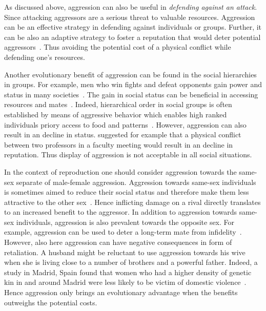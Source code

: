 As discussed above, aggression can also be useful in \textit{defending against an attack}.
Since attacking aggressors are a serious threat to valuable resources.
Aggression can be an effective strategy in defending against individuals or groups.
Further, it can be also an adaptive strategy to foster a reputation that would deter potential aggressors~\cite{Buss1997}.
Thus avoiding the potential cost of a physical conflict while defending one's resources.

Another evolutionary benefit of aggression can be found in the social hierarchies in groups.
For example, men who win fights and defeat opponents gain power and status in many societies~\cite{Hill1996}.
The gain in social status can be beneficial in accessing resources and mates~\cite{Archer2009}.
Indeed, hierarchical order in social groups is often established by means of aggressive behavior which enables high ranked individuals priory access to food and patterns~\cite{Lindenfors2011}. 
However, aggression can also result in an decline in status.
\citet{Buss1997} suggested for example that a physical conflict between two professors in a faculty meeting would result in an decline in reputation.
Thus display of aggression is not acceptable in all social situations.

In the context of reproduction one should consider aggression towards the same-sex separate of male-female aggression.
Aggression towards same-sex individuals is sometimes aimed to reduce their social status and therefore make them less attractive to the other sex~\cite{Buss1990}.
Hence inflicting damage on a rival directly translates to an increased benefit to the aggressor.
In addition to aggression towards same-sex individuals, aggression is also prevalent towards the opposite sex.
For example, aggression can be used to deter a long-term mate from infidelity~\cite{Daly1982}.
However, also here aggression can have negative consequences in form of retaliation.
A husband might be reluctant to use aggression towards his wive when she is living close to a number of brothers and a powerful father.
Indeed, a study in Madrid, Spain found that women who had a higher density of genetic kin in and around Madrid were less likely to be victim of domestic violence~\cite{Figueredo1995}.
Hence aggression only brings an evolutionary advantage when the benefits outweighs the potential costs.

